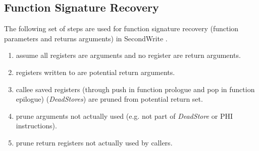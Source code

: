 
\subsection{Function Signature Recovery}



The following set of steps are used for function signature recovery (function parameters and returns arguments) in SecondWrite \cite{second_write_scalable_type_detection}.

\begin{enumerate}
	\item assume all registers are arguments and no register are return arguments.
	\item registers written to are potential return arguments.
	\item callee saved registers (through push in function prologue and pop in function epilogue) (\textit{DeadStores}) are pruned from potential return set.
	\item prune arguments not actually used (e.g. not part of \textit{DeadStore} or PHI instructions).
	\item prune return registers not actually used by callers.
\end{enumerate}
